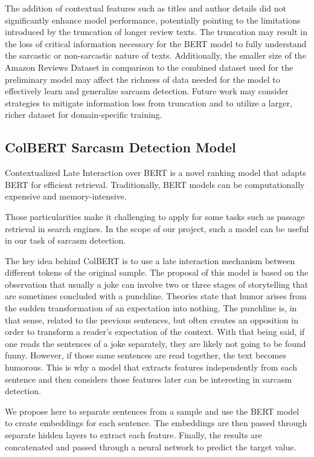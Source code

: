 \documentclass[10pt,twocolumn,letterpaper]{article}
\begin{document}
The addition of contextual features such as titles and author details did not significantly enhance model performance, potentially pointing to the limitations introduced by the truncation of longer review texts. The truncation may result in the loss of critical information necessary for the BERT model to fully understand the sarcastic or non-sarcastic nature of texts. Additionally, the smaller size of the Amazon Reviews Dataset in comparison to the combined dataset used for the preliminary model may affect the richness of data needed for the model to effectively learn and generalize sarcasm detection. Future work may consider strategies to mitigate information loss from truncation and to utilize a larger, richer dataset for domain-specific training.
\subsection{ColBERT Sarcasm Detection Model}
Contextualized Late Interaction over BERT is a novel ranking model that adapts BERT for efficient retrieval.
Traditionally, BERT models can be computationally expensive and memory-intensive.

Those particularities make it challenging to apply for some tasks such as passage retrieval in search engines.
In the scope of our project, such a model can be useful in our task of sarcasm detection.

The key idea behind ColBERT is to use a late interaction mechanism between different tokens of the original sample.
The proposal of this model is based on the observation that usually a joke can involve two or three stages of storytelling that are sometimes concluded with a punchline.
Theories state that humor arises from the sudden transformation of an expectation into nothing.
The punchline is, in that sense, related to the previous sentences, but often creates an opposition in order to transform a reader's expectation of the context.
With that being said, if one reads the sentences of a joke separately, they are likely not going to be found funny.
However, if those same sentences are read together, the text becomes humorous.
This is why a model that extracts features independently from each sentence and then considers those features later can be interesting in sarcasm detection.

We propose here to separate sentences from a sample and use the BERT model to create embeddings for each sentence.
The embeddings are then passed through separate hidden layers to extract each feature. Finally, the results are concatenated and passed through a neural network to predict the target value.
\end{document}
